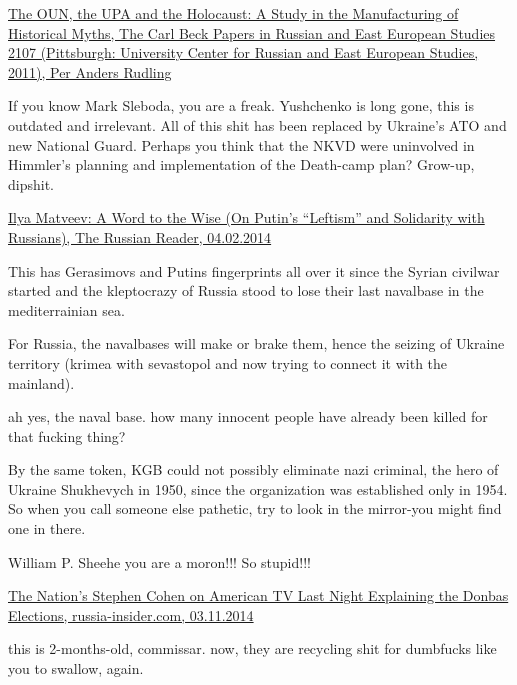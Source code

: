 \begin{itemize}
\begin{itemize}
\href{https://www.academia.edu/1122859/The_OUN_the_UPA_and_the_Holocaust_A_Study_in_the_Manufacturing_of_Historical_Myths_The_Carl_Beck_Papers_in_Russian_and_East_European_Studies_2107_Pittsburgh_University_Center_for_Russian_and_East_European_Studies_2011_}{%
The OUN, the UPA and the Holocaust: A Study in the Manufacturing of Historical Myths, The Carl Beck Papers in Russian and East European Studies 2107 (Pittsburgh: University Center for Russian and East European Studies, 2011), Per Anders Rudling%
}


If you know Mark Sleboda, you are a freak. Yushchenko is long gone, this is
outdated and irrelevant. All of this shit has been replaced by Ukraine's ATO
and new National Guard. Perhaps you think that the NKVD were uninvolved in
Himmler's planning and implementation of the Death-camp plan? Grow-up, dipshit.

\href{https://therussianreader.com/2014/02/04/matveev-putin-leftism}{%
Ilya Matveev: A Word to the Wise (On Putin’s \enquote{Leftism} and Solidarity with Russians), %
The Russian Reader, 04.02.2014%
}


This has Gerasimovs and Putins fingerprints all over it since the Syrian
civilwar started and the kleptocrazy of Russia stood to lose their last
navalbase in the mediterrainian sea.

For Russia, the navalbases will make or brake them, hence the seizing of
Ukraine territory (krimea with sevastopol and now trying to connect it with the
mainland).


ah yes, the naval base. how many innocent people have already been killed for
that fucking thing?


By the same token, KGB could not possibly eliminate nazi criminal, the hero of
Ukraine Shukhevych in 1950, since the organization was established only in
1954. So when you call someone else pathetic, try to look in the mirror-you
might find one in there.

William P. Sheehe you are a moron!!! So stupid!!!


\href{https://russia-insider.com/en/tv_politics_ukraine/2014/11/07/01-12-12pm/nations_stephen_cohen_american_tv_last_night_explaining}{%
The Nation's Stephen Cohen on American TV Last Night Explaining the Donbas Elections, russia-insider.com, 03.11.2014%
}


this is 2-months-old, commissar. now, they are recycling shit for dumbfucks
like you to swallow, again.


\end{itemize} %

\end{itemize} %
